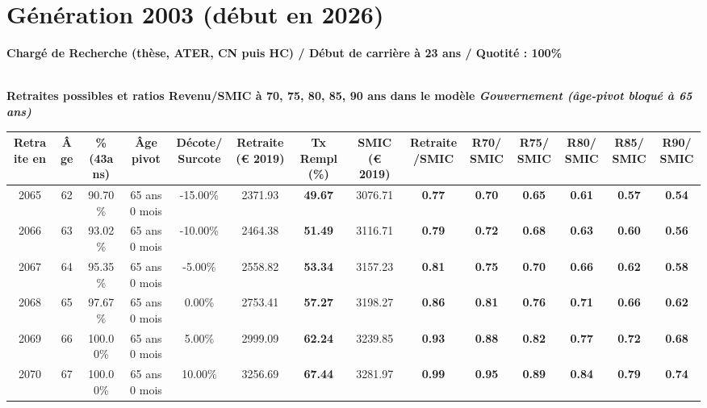 \newpage 
 
\section{Génération 2003 (début en 2026)\label{CR_100_2003_23_0}} 
 
{\bf \noindent Chargé de Recherche (thèse, ATER, CN puis HC) / Début de carrière à 23 ans / Quotité : 100\%}  ~ 

 ~\\{\bf \noindent Retraites possibles et ratios Revenu/SMIC à 70, 75, 80, 85, 90 ans dans le modèle \emph{Gouvernement (âge-pivot bloqué à 65 ans)}}  
 
\begin{adjustbox}{max width=\textwidth} 
\begin{tabular}[htb]{|c|c||c|c|c||c|c||c|c||c|c|c|c|c|} 
\hline 
 Retraite en &  Âge &  \%(43ans) &  Âge pivot &  Décote/Surcote &  Retraite (\euro{} 2019) &  Tx Rempl(\%) &  SMIC (\euro{} 2019) &  Retraite/SMIC &  R70/SMIC &  R75/SMIC &  R80/SMIC &  R85/SMIC &  R90/SMIC \\ 
\hline \hline 
 2065 &  62 &  90.70\% &  65 ans 0 mois &  -15.00\% &  2371.93 &  {\bf 49.67} &  3076.71 &  {\bf {\color{red} 0.77}} &  {\bf {\color{red} 0.70}} &  {\bf {\color{red} 0.65}} &  {\bf {\color{red} 0.61}} &  {\bf {\color{red} 0.57}} &  {\bf {\color{red} 0.54}} \\ 
\hline 
 2066 &  63 &  93.02\% &  65 ans 0 mois &  -10.00\% &  2464.38 &  {\bf 51.49} &  3116.71 &  {\bf {\color{red} 0.79}} &  {\bf {\color{red} 0.72}} &  {\bf {\color{red} 0.68}} &  {\bf {\color{red} 0.63}} &  {\bf {\color{red} 0.60}} &  {\bf {\color{red} 0.56}} \\ 
\hline 
 2067 &  64 &  95.35\% &  65 ans 0 mois &  -5.00\% &  2558.82 &  {\bf 53.34} &  3157.23 &  {\bf {\color{red} 0.81}} &  {\bf {\color{red} 0.75}} &  {\bf {\color{red} 0.70}} &  {\bf {\color{red} 0.66}} &  {\bf {\color{red} 0.62}} &  {\bf {\color{red} 0.58}} \\ 
\hline 
 2068 &  65 &  97.67\% &  65 ans 0 mois &  0.00\% &  2753.41 &  {\bf 57.27} &  3198.27 &  {\bf {\color{red} 0.86}} &  {\bf {\color{red} 0.81}} &  {\bf {\color{red} 0.76}} &  {\bf {\color{red} 0.71}} &  {\bf {\color{red} 0.66}} &  {\bf {\color{red} 0.62}} \\ 
\hline 
 2069 &  66 &  100.00\% &  65 ans 0 mois &  5.00\% &  2999.09 &  {\bf 62.24} &  3239.85 &  {\bf {\color{red} 0.93}} &  {\bf {\color{red} 0.88}} &  {\bf {\color{red} 0.82}} &  {\bf {\color{red} 0.77}} &  {\bf {\color{red} 0.72}} &  {\bf {\color{red} 0.68}} \\ 
\hline 
 2070 &  67 &  100.00\% &  65 ans 0 mois &  10.00\% &  3256.69 &  {\bf 67.44} &  3281.97 &  {\bf {\color{red} 0.99}} &  {\bf {\color{red} 0.95}} &  {\bf {\color{red} 0.89}} &  {\bf {\color{red} 0.84}} &  {\bf {\color{red} 0.79}} &  {\bf {\color{red} 0.74}} \\ 
\hline 
\hline 
\end{tabular} 
\end{adjustbox} 
 
